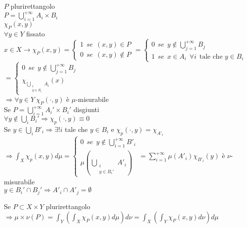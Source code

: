 \documentclass[12px]{article}
\begin{document}
 $P$ plurirettangolo\\
  $P = \bigcup^{+\infty}_{i=1}A_i\times B_i$ \\
  $\chi_P(x,y)$\\
   $\forall y\in Y$ fissato\\
    $x\in X \rightarrow \chi_P(x,y) = \begin{cases}
    	1 \ \ se \ \ (x,y)\in P\\
    	0 \ \ se \ \ (x,y)\not\in P
    \end{cases} = \begin{cases}
    	0 \ \ se \ \ y\not\in \bigcup^{+\infty}_{j = 1}B_j\\
	1 \ \ se \ \ x\in A_i\ \ \forall i\ \ \text{tale che } y\in B_i
    \end{cases}$\\
    $ = \begin{cases}
    	0 \ \ se \ \ y\not\in \bigcup^{+\infty}_{j = 1}B_j\\
	\chi_{ \bigcup^{}_{\substack{i\\ y\in B_i}}A_i}(x)
    \end{cases}$\\
    $ \Rightarrow  \forall y\in Y \ \chi_P(\cdot,y)$ è $\mu$-misurabile\\
    Se $P = \bigcup^{+\infty}_{i=1}A_i'\times B_i'$ disgiunti\\
    $\forall y\not\in \bigcup^{}_{i}B_i' \Rightarrow  \chi_p(\cdot, y) \equiv 0$ \\
    Se $y\in \bigcup^{}_{i}B'_i \Rightarrow  \exists! i$  tale che $y\in B_i$ e $\chi_p(\cdot, y) = \chi_{A'_i}$\\
     $ \Rightarrow  \int_X \chi_p(x,y)d\mu = \begin{cases}
     	0\ \ se \ \ y\not\in \bigcup^{+\infty}_{i =1}B'_i\\
	\mu( \bigcup^{}_{\substack{i\\y\in B_i'}}A'_i)
\end{cases} = \sum^{+\infty}_{i=1}\mu(A'_i)\chi_{B'_i}(y)$ è $\nu$-misurabile\\
$y\in B_i'\cap B_j' \Rightarrow A'_i\cap A'_j = \emptyset$
\begin{prop}
	Se $P\subset X\times Y$ plurirettangolo\\
	 $ \Rightarrow  \mu\times\nu(P)= \int_Y \left(\int_X \chi_P(x,y)d\mu \right)d\nu = \int_X \left(\int_Y\chi_P(x,y)d\nu \right)d\mu$
\end{prop}
\end{document}
